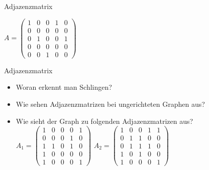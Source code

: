 \begin{frame}{Adjazenzmatrix}
  \begin{center}
  \end{center}
  \begin{center}
    $A=\begin{pmatrix}
      1&0&0&1&0\\
      0&0&0&0&0\\
      0&1&0&0&1\\
      0&0&0&0&0\\
      0&0&1&0&0
    \end{pmatrix}$
  \end{center}
\end{frame}

\begin{frame}{Adjazenzmatrix}
  \begin{itemize}
    \item Woran erkennt man Schlingen?
    \item Wie sehen Adjazenzmatrizen bei ungerichteten Graphen aus?
    \item Wie sieht der Graph zu folgenden Adjazenzmatrizen aus?\\
      $A_{1}=\begin{pmatrix}
        1&0&0&0&1\\
        0&0&0&1&0\\
        1&1&0&1&0\\
        1&0&0&0&0\\
        1&0&0&0&1
      \end{pmatrix}$
      $A_{2}=\begin{pmatrix}
        1&0&0&1&1\\
        0&1&1&0&0\\
        0&1&1&1&0\\
        1&0&1&0&0\\
        1&0&0&0&1
      \end{pmatrix}$
  \end{itemize}
\end{frame}

